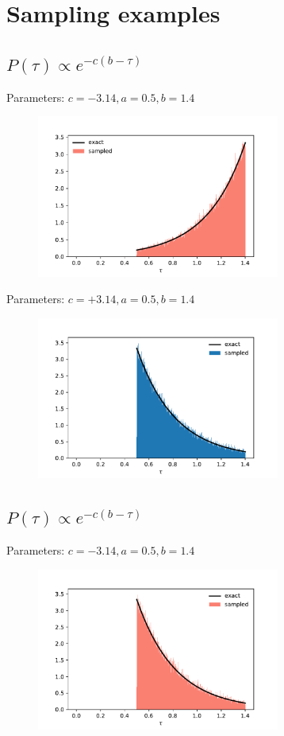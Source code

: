 \documentclass[12pt, two sided]{article}
\begin{document}

\section{Sampling examples}

\subsection{$P(\tau) \propto e^{-c(b-\tau)}$}

Parameters: $ c=-3.14 , a = 0.5, b = 1.4$

\begin{figure}[h!]
\includegraphics[width=8cm]{../figures/case1_cneg.pdf}
\end{figure}

Parameters: $ c=+3.14 , a = 0.5, b = 1.4$

\begin{figure}[h!]
\includegraphics[width=8cm]{../figures/case1_cpos.pdf}
\end{figure}

\subsection{$P(\tau) \propto e^{-c(b-\tau)}$}

Parameters: $ c=-3.14 , a = 0.5, b = 1.4$

\begin{figure}[h!]
\includegraphics[width=8cm]{../figures/case2_cneg.pdf}
\end{figure}
\end{document}
